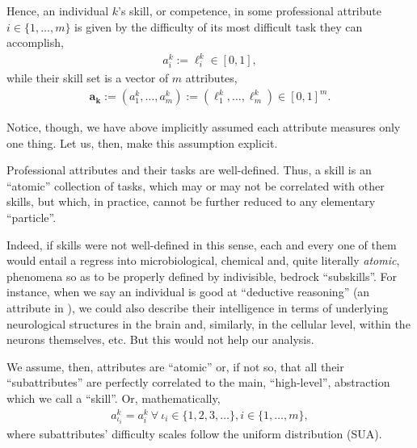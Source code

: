 \documentclass[hidelinks, nonatbib]{elsarticle}
\begin{document}
\begin{definition}[Skill]
    \label{def_skill}
    Hence, an individual $k$'s skill, or competence, in some professional attribute $i \in \{1, \dots, m\}$ is given by the difficulty of its most difficult task they can accomplish,
    \begin{gather}
        a_{i}^{k}
        :=
        \ell_{i}^{k}
        \in
        [0,1]
        ,
    \end{gather}
    while their skill set is a vector of $m$ attributes,
    \begin{gather}
        \boldsymbol{a_k}
        :=
        (
            a_{1}^{k}
            ,
            \dots
            ,
            a_{m}^{k}
        )
        :=
        (
            \ell_{1}^{k}
            ,
            \dots
            ,
            \ell_{m}^{k}
        )
        \in
        [0,1] ^ m
        .
    \end{gather}
\end{definition}

Notice, though, we have above implicitly assumed each attribute measures only one thing. Let us, then, make this assumption explicit.
\begin{axiom}
    \label{aaa}
    Professional attributes and their tasks are well-defined. Thus, a skill is an ``atomic'' collection of tasks, which may or may not be correlated with other skills, but which, in practice, cannot be further reduced to any elementary ``particle''.
    
    Indeed, if skills were not well-defined in this sense, each and every one of them would entail a regress into microbiological, chemical and, quite literally \textit{atomic}, phenomena so as to be properly defined by indivisible, bedrock ``subskills''. For instance, when we say an individual is good at ``deductive reasoning'' (an attribute in \cite{onet2023data}), we could also describe their intelligence in terms of underlying neurological structures in the brain and, similarly, in the cellular level, within the neurons themselves, etc. But this would not help our analysis.

    We assume, then, attributes are ``atomic'' or, if not so, that all their ``subattributes'' are perfectly correlated to the main, ``high-level'', abstraction which we call a ``skill''. Or, mathematically,
    \begin{gather}
        a_{\iota_i}^{k}
        =
        a_{i}^{k}
        \
        \forall
        \
        \iota_i
        \in 
        \{1, 2, 3, \dots\},
        i \in \{1, \dots, m\}
        ,
    \end{gather}
    where subattributes' difficulty scales follow the uniform distribution (SUA).
\end{axiom}
\end{document}
